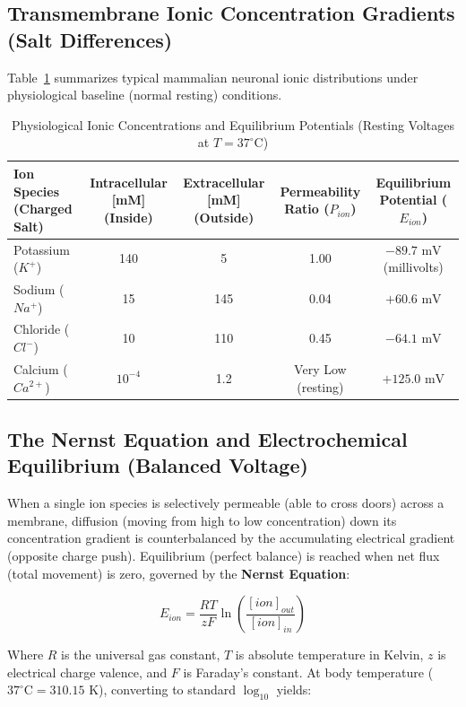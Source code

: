 \documentclass[10pt,journal,compsoc,onecolumn]{IEEEtran}
\begin{document}
\subsection{Transmembrane Ionic Concentration Gradients (Salt Differences)}

Table~\ref{tab:ionic_concentrations} summarizes typical mammalian neuronal ionic distributions under physiological baseline (normal resting) conditions.

\begin{table}[htbp]
\caption{Physiological Ionic Concentrations and Equilibrium Potentials (Resting Voltages at $T = 37^\circ\text{C}$)}
\label{tab:ionic_concentrations}
\centering
\begin{tabular}{lcccc}
\toprule
\textbf{Ion Species (Charged Salt)} & \textbf{Intracellular [mM] (Inside)} & \textbf{Extracellular [mM] (Outside)} & \textbf{Permeability Ratio ($P_{ion}$)} & \textbf{Equilibrium Potential ($E_{ion}$)} \\
\midrule
Potassium ($K^+$) & 140 & 5 & 1.00 & $-89.7\text{ mV}$ (millivolts) \\
Sodium ($Na^+$) & 15 & 145 & 0.04 & $+60.6\text{ mV}$ \\
Chloride ($Cl^-$) & 10 & 110 & 0.45 & $-64.1\text{ mV}$ \\
Calcium ($Ca^{2+}$) & $10^{-4}$ & 1.2 & Very Low (resting) & $+125.0\text{ mV}$ \\
\bottomrule
\end{tabular}
\end{table}

\subsection{The Nernst Equation and Electrochemical Equilibrium (Balanced Voltage)}

When a single ion species is selectively permeable (able to cross doors) across a membrane, diffusion (moving from high to low concentration) down its concentration gradient is counterbalanced by the accumulating electrical gradient (opposite charge push). Equilibrium (perfect balance) is reached when net flux (total movement) is zero, governed by the \textbf{Nernst Equation}:

\begin{equation}
E_{ion} = \frac{RT}{zF} \ln \left( \frac{[ion]_{out}}{[ion]_{in}} \right)
\end{equation}

Where $R$ is the universal gas constant, $T$ is absolute temperature in Kelvin, $z$ is electrical charge valence, and $F$ is Faraday's constant. At body temperature ($37^\circ\text{C} = 310.15\text{ K}$), converting to standard $\log_{10}$ yields:
\end{document}
